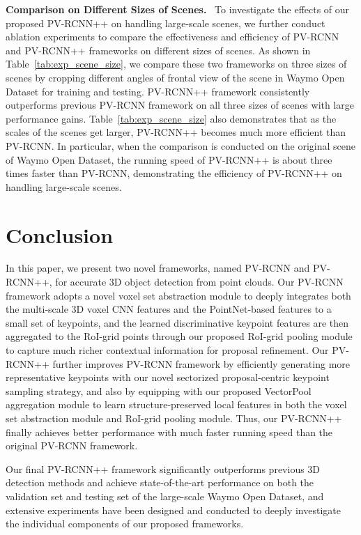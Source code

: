 \documentclass[natbib,twocolumn]{svjour3}          \smartqed  \usepackage{graphicx}
\begin{document}
\noindent
\textbf{Comparison on Different Sizes of Scenes.}~
To investigate the effects of our proposed PV-RCNN++ on handling large-scale scenes, we further conduct ablation experiments to compare the effectiveness and efficiency of PV-RCNN and PV-RCNN++ frameworks on different sizes of scenes. As shown in Table~\ref{tab:exp_scene_size}, we compare these two frameworks on three sizes of scenes by cropping different angles of frontal view of the scene in Waymo Open Dataset for training and testing.
PV-RCNN++ framework consistently outperforms previous PV-RCNN framework on all three sizes of scenes with large performance gains. 
Table~\ref{tab:exp_scene_size} also demonstrates that as the scales of the scenes get larger, PV-RCNN++ becomes much more efficient than PV-RCNN. 
In particular, when the comparison is conducted on the original scene of Waymo Open Dataset, the running speed of PV-RCNN++ is about three times  faster than PV-RCNN, demonstrating the efficiency of PV-RCNN++ on handling large-scale scenes. 



\section{Conclusion}
In this paper, we present two novel frameworks, named PV-RCNN and PV-RCNN++, for accurate 3D object detection from point clouds. 
Our PV-RCNN framework adopts a novel voxel set abstraction module to deeply integrates both the multi-scale 3D voxel CNN features and the PointNet-based features to a small set of keypoints, and the learned discriminative keypoint features are then aggregated to the RoI-grid points through our proposed RoI-grid pooling module to capture much richer contextual information for proposal refinement. 
Our PV-RCNN++ further improves PV-RCNN framework by efficiently generating more representative keypoints with our novel sectorized proposal-centric keypoint sampling strategy, and also by equipping with our proposed VectorPool aggregation module to learn structure-preserved local features in both the voxel set abstraction module and RoI-grid pooling module. Thus, our PV-RCNN++ finally achieves better performance with much faster running speed than the original PV-RCNN framework.

Our final PV-RCNN++ framework significantly outperforms previous 3D detection methods and achieve state-of-the-art performance on both the validation set and testing set of the large-scale Waymo Open Dataset, and extensive experiments have been designed and conducted to deeply investigate the individual components of our proposed frameworks.  



         
\end{document}

